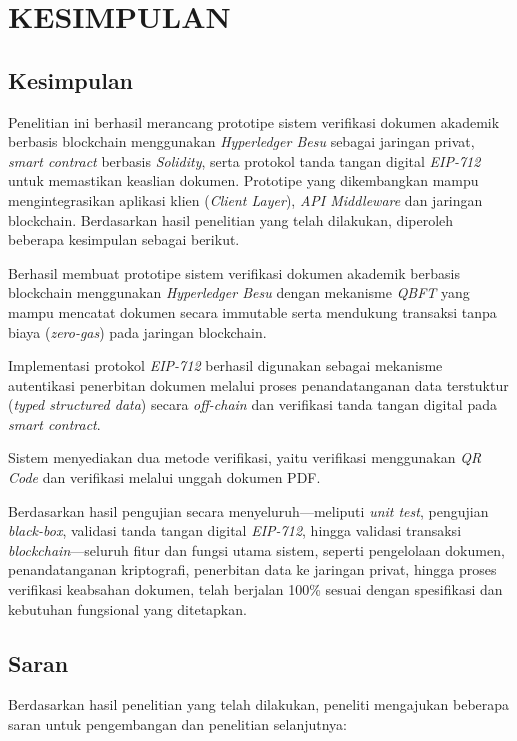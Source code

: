 \chapter{KESIMPULAN}
\setlength{\leftskip}{0.7cm}
	\section{Kesimpulan}
	Penelitian ini berhasil merancang prototipe sistem verifikasi dokumen akademik berbasis blockchain menggunakan \textit{Hyperledger Besu} sebagai jaringan privat, \textit{smart contract} berbasis \textit{Solidity}, serta protokol tanda tangan digital \textit{EIP-712} untuk memastikan keaslian dokumen. Prototipe yang dikembangkan mampu mengintegrasikan aplikasi klien (\textit{Client Layer}), \textit{API Middleware} dan jaringan blockchain. Berdasarkan hasil penelitian yang telah dilakukan, diperoleh beberapa kesimpulan sebagai berikut. 

	\begin{subsecenumerate}
		\item Berhasil membuat prototipe sistem verifikasi dokumen akademik berbasis blockchain menggunakan \textit{Hyperledger Besu} dengan mekanisme \textit{QBFT} yang mampu mencatat dokumen secara immutable serta mendukung transaksi tanpa biaya (\textit{zero-gas}) pada jaringan blockchain.
		\item Implementasi protokol \textit{EIP-712} berhasil digunakan sebagai mekanisme autentikasi penerbitan dokumen melalui proses penandatanganan data terstuktur (\textit{typed structured data}) secara \textit{off-chain} dan verifikasi tanda tangan digital pada \textit{smart contract}.
		\item Sistem menyediakan dua metode verifikasi, yaitu verifikasi menggunakan \textit{QR Code} dan verifikasi melalui unggah dokumen PDF.
		\item Berdasarkan hasil pengujian secara menyeluruh—meliputi \textit{unit test}, pengujian \textit{black-box}, validasi tanda tangan digital \textit{EIP-712}, hingga validasi transaksi \textit{blockchain}—seluruh fitur dan fungsi utama sistem, seperti pengelolaan dokumen, penandatanganan kriptografi, penerbitan data ke jaringan privat, hingga proses verifikasi keabsahan dokumen, telah berjalan 100\% sesuai dengan spesifikasi dan kebutuhan fungsional yang ditetapkan.
	\end{subsecenumerate}
	
	\section{Saran}
	Berdasarkan hasil penelitian yang telah dilakukan, peneliti mengajukan beberapa saran untuk pengembangan dan penelitian selanjutnya:

